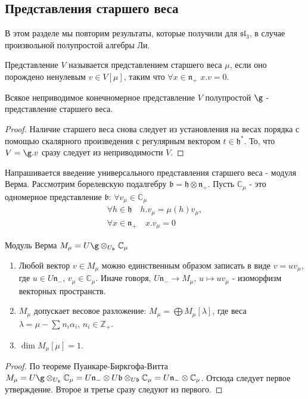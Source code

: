 \documentclass[a4article]{article}
\begin{document}
\subsection*{Представления старшего веса}

В этом разделе мы повторим результаты, которые получили для $\mathfrak{sl}_3$, в случае произвольной полупростой алгебры Ли.
\begin{definition}
    Представление $V$ называется представлением старшего веса $\mu$, если оно порождено ненулевым $v \in V[\mu]$, таким что $\forall x \in \mathfrak{n}_+$ $x.v=0$.
\end{definition}
\begin{theorem}
    Всякое неприводимое конечномерное представление $V$ полупростой $\g$ - представление старшего веса.
\end{theorem}
\begin{proof}
    Наличие старшего веса снова следует из установления на весах порядка с помощью скалярного произведения с регулярным вектором $t \in \mathfrak{h}^*$. То, что $V=\g.v$ сразу следует из неприводимости $V$.
\end{proof}

Напрашивается введение универсального представления старшего веса - модуля Верма. Рассмотрим борелевскую подалгебру $\mathfrak{b}=\mathfrak{h}\otimes \mathfrak{n_+}$. Пусть $\mathbb{C}_{\mu}$ - это одномерное представление $\mathfrak{b}$: $\forall v_{\mu}\in \mathbb{C}_{\mu}$
\begin{equation}
\begin{gathered}
    \forall h \in \mathfrak{h} \quad h.v_{\mu}=\mu(h)v_{\mu}, \\
    \forall x \in \mathfrak{n_+} \quad 
    x.v_{\mu}=0
\end{gathered}
\end{equation}

\begin{definition}
    Модуль Верма $M_{\mu} = U\g \otimes_{U_{\mathfrak{b}}}\mathbb{C}_{\mu} $
\end{definition}
\begin{theorem}
    \begin{enumerate}
        \item Любой вектор $v \in M_{\mu}$ можно единственным образом записать в виде $v = uv_{\mu}$, где $u \in U\mathfrak{n}_-$, $v_{\mu} \in \mathbb{C}_{\mu}$. Иначе говоря, $U\mathfrak{n}_- \rightarrow M_{\mu}$, $u \mapsto uv_{\mu}$ - изоморфизм векторных пространств.
        \item $M_{\mu}$ допускает весовое разложение: $M_{\mu}=\bigoplus M_{\mu}[\lambda]$, где веса $\lambda = \mu - \sum_{}n_i\alpha_i$, $n_i \in \mathbb{Z}_+$.
        \item $\dim M_{\mu}[\mu]=1$.
    \end{enumerate}
\end{theorem}
\begin{proof}
    По теореме Пуанкаре-Биркгофа-Витта $M_{\mu}=U\g \otimes_{U_{\mathfrak{b}}}\mathbb{C}_{\mu}=U\mathfrak{n}_-\otimes U\mathfrak{b}\otimes_{U\mathfrak{b}}\mathbb{C}_{\mu}=U\mathfrak{n}_-\otimes\mathbb{C}_{\mu}$. Отсюда следует первое утверждение. Второе и третье сразу следуют из первого.
\end{proof}
\end{document}
